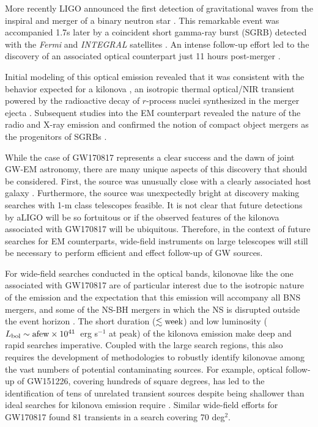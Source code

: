 More recently LIGO announced the first detection of gravitational waves from the inspiral and merger of a binary neutron star \citep[GW170817][]{LIGOGW170817}. This remarkable event was accompanied 1.7s later by a coincident short gamma-ray burst (SGRB) detected with the {\it Fermi} and {\it INTEGRAL} satellites \citep{LIGOGW170817grb,GW170817Fermi,Savchenko+17}. An intense follow-up effort led to the discovery of an associated optical counterpart just 11 hours post-merger \citep{LIGOMMAPaper,gw170817lco,Coulter+17,GW170817DECam,Valenti+17}.

Initial modeling of this optical emission revealed that it was consistent with the behavior expected for a kilonova \citep{cowp17, kilpatrick17, Tanaka+18, villar17}, an isotropic thermal optical/NIR transient powered by the radioactive decay of $r$-process nuclei synthesized in the merger ejecta \citep[see e.g.,][]{Metzger+10,Kasen+13,BarnesKasen13,Metzger2017}. Subsequent studies into the EM counterpart revealed the nature of the radio and X-ray emission \citep{Alexander+17,davanzo18,Margutti+17,Margutti+18,Mooley+18,Troja+17} and confirmed the notion of compact object mergers as the progenitors of SGRBs \citep{Fong+13, Berger2014, Fong+15, Fong+17}.

While the case of GW170817 represents a clear success and the dawn of joint GW-EM astronomy, there are many unique aspects of this discovery that should be considered. First, the source was unusually close \citep[$D \approx 40$~Mpc,][]{LIGOGW170817} with a clearly associated host galaxy \citep[NGC 4993,][]{Blanchard+17,cantiello18}. Furthermore, the source was unexpectedly bright at discovery \citep[$m_i \approx 17.5$~mag,][]{LIGOMMAPaper,gw170817lco,Coulter+17,GW170817DECam,Valenti+17} making searches with 1-m class telescopes feasible. It is not clear that future detections by aLIGO will be so fortuitous or if the observed features of the kilonova associated with GW170817 will be ubiquitous. Therefore, in the context of future searches for EM counterparts, wide-field instruments on large telescopes will still be necessary to perform efficient and effect follow-up of GW sources.

For wide-field searches conducted in the optical bands, kilonovae like the one associated with GW170817 are of particular interest due to the isotropic nature of the emission and the expectation that this emission will accompany all BNS mergers, and some of the NS-BH mergers in which the NS is disrupted outside the event horizon \citep{MetzgerBerger12}. The short duration ($\lesssim {\rm week}$) and low luminosity ($L_{\rm bol} \sim {\rm a few} \times 10^{41}$~erg s$^{-1}$ at peak) of the kilonova emission make deep and rapid searches imperative. Coupled with the large search regions, this also requires the development of methodologies to robustly identify kilonovae among the vast numbers of potential contaminating sources. For example, optical follow-up of GW151226, covering hundreds of square degrees, has led to the identification of tens of unrelated transient sources despite being shallower than ideal searches for kilonova emission require \citep[e.g.,][]{cenko15,cenko16,GW151226PS1}. Similar wide-field efforts for GW170817 \citep[e.g., DECam][]{GW170817DECam} found 81 transients in a search covering 70 deg$^2$.

